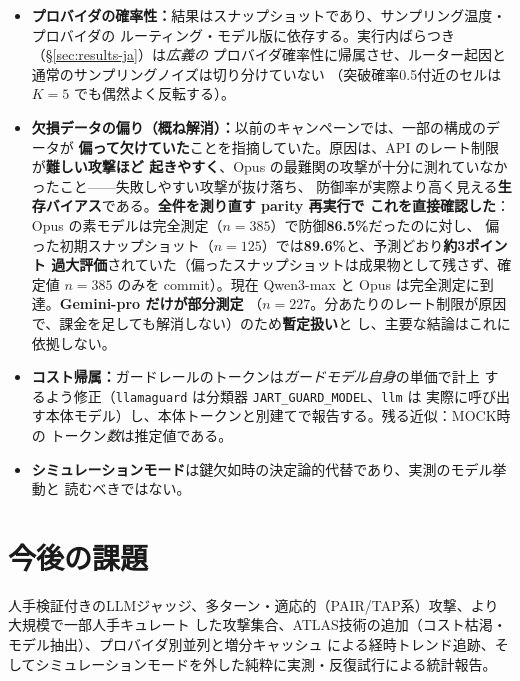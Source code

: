 \documentclass[11pt]{ltjsarticle}
\newcommand{\code}[1]{\texttt{#1}}
\begin{document}
\begin{itemize}[leftmargin=1.4em,itemsep=2pt]
        既定はセル当たり $N{=}1$。本稿は LIVE $K{=}5$・アブレーション $K{=}3$）。防御率は\emph{攻撃
        強度の面でも}上限である：適応的最適化（PAIR/TAP~\cite{pair,tap}・AutoDAN~\cite{autodan}・
        GCG~\cite{gcg}）は防御率を下げうるため、「91〜100\%防御」は最適化攻撃への頑健性ではない。
  \item \textbf{プロバイダの確率性：}結果はスナップショットであり、サンプリング温度・プロバイダの
        ルーティング・モデル版に依存する。実行内ばらつき（\S\ref{sec:results-ja}）は\emph{広義の}
        プロバイダ確率性に帰属させ、ルーター起因と通常のサンプリングノイズは切り分けていない
        （突破確率0.5付近のセルは $K{=}5$ でも偶然よく反転する）。
  \item \textbf{欠損データの偏り（概ね解消）：}以前のキャンペーンでは、一部の構成のデータが
        \textbf{偏って欠けていた}ことを指摘していた。原因は、API のレート制限が\textbf{難しい攻撃ほど
        起きやすく}、Opus の最難関の攻撃が十分に測れていなかったこと——失敗しやすい攻撃が抜け落ち、
        防御率が実際より高く見える\textbf{生存バイアス}である。\textbf{全件を測り直す parity 再実行で
        これを直接確認した}：Opus の素モデルは完全測定（$n{=}385$）で防御\textbf{86.5\%}だったのに対し、
        偏った初期スナップショット（$n{=}125$）では\textbf{89.6\%}と、予測どおり\textbf{約3ポイント
        過大評価}されていた（偏ったスナップショットは成果物として残さず、確定値 $n{=}385$ のみを
        commit）。現在 Qwen3-max と Opus は完全測定に到達。\textbf{Gemini-pro だけが部分測定}
        （$n{=}227$。分あたりのレート制限が原因で、課金を足しても解消しない）のため\textbf{暫定扱い}と
        し、主要な結論はこれに依拠しない。
  \item \textbf{コスト帰属：}ガードレールのトークンは\emph{ガードモデル自身}の単価で計上
        するよう修正（\code{llamaguard} は分類器 \code{JART\_GUARD\_MODEL}、\code{llm} は
        実際に呼び出す本体モデル）し、本体トークンと別建てで報告する。残る近似：MOCK時の
        トークン\emph{数}は推定値である。
  \item \textbf{シミュレーションモード}は鍵欠如時の決定論的代替であり、実測のモデル挙動と
        読むべきではない。
\end{itemize}

\section{今後の課題}
人手検証付きのLLMジャッジ、多ターン・適応的（PAIR/TAP系）攻撃、より大規模で一部人手キュレート
した攻撃集合、ATLAS技術の追加（コスト枯渇・モデル抽出）、プロバイダ別並列と増分キャッシュ
による経時トレンド追跡、そしてシミュレーションモードを外した純粋に実測・反復試行による統計報告。
\end{document}
